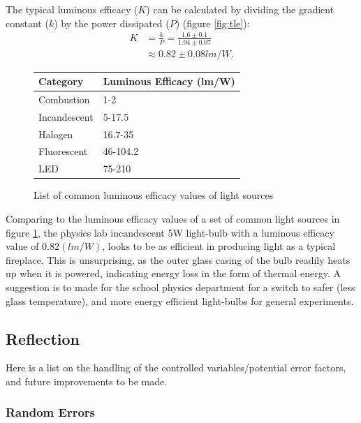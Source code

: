\documentclass[a4paper,12pt]{article}
\begin{document}
The typical luminous efficacy ($K$) can be calculated by dividing the gradient constant ($k$) by the power dissipated ($P$) (figure \ref{fig:tle}):
\begin{align*}
    K &= \frac{k}{P} = \frac{1.6 \pm 0.1}{1.94 \pm 0.07}\\
    &\approx 0.82 \pm 0.08 \si{lm\per W}.
\end{align*}

\begin{figure}
    \centering
    \begin{tabular}{l|l}
        Category     & Luminous Efficacy (lm/W) \\ \hline
        Combustion   & 1-2                      \\
        Incandescent & 5-17.5                   \\
        Halogen      & 16.7-35                  \\
        Fluorescent  & 46-104.2                 \\
        LED          & 75-210
    \end{tabular}
    \caption{List of common luminous efficacy values of light sources\protect\footnotemark}
    \label{tbl:leff}
\end{figure}



Comparing to the luminous efficacy values of a set of common light sources in figure \ref{tbl:leff}, the physics lab incandescent 5W light-bulb with a luminous efficacy value of $0.82 (\si{lm\per W})$, looks to be as efficient in producing light as a typical fireplace. This is unsurprising, as the outer glass casing of the bulb readily heats up when it is powered, indicating energy loss in the form of thermal energy. A suggestion is to made for the school physics department for a switch to safer (less glass temperature), and more energy efficient light-bulbs for general experiments.

\subsection{Reflection}

Here is a list on the handling of the controlled variables/potential error factors, and future improvements to be made.

\subsubsection{Random Errors}
\end{document}
